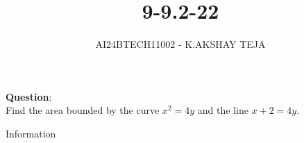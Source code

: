 \documentclass[journal]{IEEEtran}
\begin{document}

\vspace{3cm}

\title{9-9.2-22}
\author{AI24BTECH11002 - K.AKSHAY TEJA}
{\let\newpage\relax\maketitle}

\renewcommand{\thefigure}{\theenumi}
\renewcommand{\thetable}{\theenumi}
\setlength{\intextsep}{10pt} %


\renewcommand{\thetable}{\theenumi}


\textbf{Question}:\\
Find the area bounded by the curve  $x^{2} = 4y$ and the line $x + 2 = 4y$.


\solution
\begin{table}[h!]
	\centering
	
	\caption{Information}
	\label{tab:9-9.2-22}
\end{table}
\end{document}
